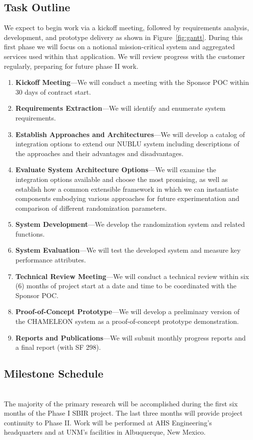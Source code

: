 \documentclass{sbir}
\begin{document}
\subsection{Task Outline}
We expect to begin work via a kickoff meeting, followed by requirements analysis, development, and prototype delivery as shown in Figure~\ref{fig:gantt}.  During this first phase we will focus on a notional mission-critical system and aggregated services used within that application.  We will review progress with the customer regularly, preparing for future phase II work.
\begin{enumerate}

\vspace{-0.1in}
\item {\bf Kickoff Meeting}---We will conduct a meeting with the Sponsor POC within 30 days of contract start.
\item {\bf Requirements Extraction}---We will identify and enumerate system requirements.
\item {\bf Establish Approaches and Architectures}---We will develop a catalog of integration options to extend our NUBLU system including descriptions of the approaches and their advantages and disadvantages.
\item {\bf Evaluate System Architecture Options}---We will examine the integration options available and choose the most promising, as well as establish how a common extensible framework in which we can instantiate components embodying various approaches for future experimentation and comparison of different randomization parameters.
\item {\bf System Development}---We develop the randomization system and related functions.
\item {\bf System Evaluation}---We will test the developed system and measure key performance attributes.
\item {\bf Technical Review Meeting}---We will conduct a technical review within six (6) months of project start at a date and time to be coordinated with the Sponsor POC.
\item {\bf Proof-of-Concept Prototype}---We will develop a preliminary version of the CHAMELEON system as a proof-of-concept prototype demonstration.
\item {\bf Reports and Publications}---We will submit monthly progress reports and a final report (with SF 298).
\end{enumerate}

\subsection{Milestone Schedule}~\\
The majority of the primary research will be accomplished during the first six months of the Phase I SBIR project. The last three months will provide project continuity to Phase II. Work will be performed at AHS Engineering's  headquarters and at UNM's facilities in Albuquerque, New Mexico.
\end{document}
